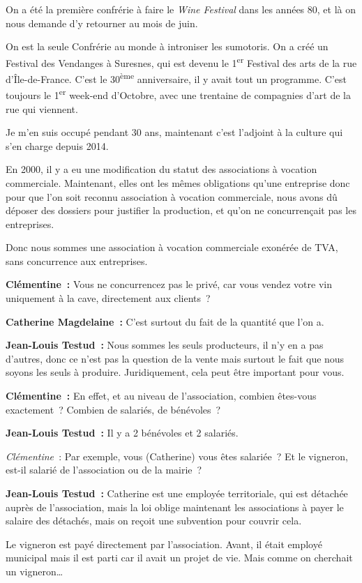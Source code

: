 \documentclass[a4paper, titlepage]{report}
\begin{document}
On a été la première confrérie à faire le \emph{Wine Festival} dans les
années 80, et là on nous demande d'y retourner au mois de juin.

On est la seule Confrérie au monde à introniser les sumotoris. On a créé
un Festival des Vendanges à Suresnes, qui est devenu le
1\textsuperscript{er} Festival des arts de la rue d'Île-de-France. C'est
le 30\textsuperscript{ème} anniversaire, il y avait tout un programme.
C'est toujours le 1\textsuperscript{er} week-end d'Octobre, avec une
trentaine de compagnies d'art de la rue qui viennent.

Je m'en suis occupé pendant 30 ans, maintenant c'est l'adjoint à la
culture qui s'en charge depuis 2014.

En 2000, il y a eu une modification du statut des associations à
vocation commerciale. Maintenant, elles ont les mêmes obligations qu'une
entreprise donc pour que l'on soit reconnu association à vocation
commerciale, nous avons dû déposer des dossiers pour justifier la
production, et qu'on ne concurrençait pas les entreprises.

Donc nous sommes une association à vocation commerciale exonérée de TVA,
sans concurrence aux entreprises.

\textbf{Clémentine~:} Vous ne concurrencez pas le privé, car vous vendez
votre vin uniquement à la cave, directement aux clients~?

\textbf{Catherine Magdelaine~:} C'est surtout du fait de la quantité
que l'on a.

\textbf{Jean-Louis Testud~:} Nous sommes les seuls producteurs, il n'y
en a pas d'autres, donc ce n'est pas la question de la vente mais surtout
le fait que nous soyons les seuls à produire. Juridiquement, cela peut
être important pour vous.

\textbf{Clémentine~:} En effet, et au niveau de l'association, combien
êtes-vous exactement~? Combien de salariés, de bénévoles~?

\textbf{Jean-Louis Testud~:} Il y a 2 bénévoles et 2 salariés.

\emph{Clémentine~}: Par exemple, vous (Catherine) vous êtes salariée~?
Et le vigneron, est-il salarié de l'association ou de la mairie~?

\textbf{Jean-Louis Testud~:} Catherine est une employée territoriale,
qui est détachée auprès de l'association, mais la loi oblige maintenant
les associations à payer le salaire des détachés, mais on reçoit une
subvention pour couvrir cela.

Le vigneron est payé directement par l'association. Avant, il était
employé municipal mais il est parti car il avait un projet de vie. Mais
comme on cherchait un vigneron\ldots{}
\end{document}
